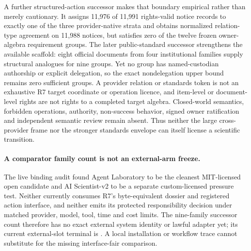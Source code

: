 A further structured-action successor makes that boundary empirical rather
than merely cautionary. It assigns 11,976 of 11,991 rights-valid notice records
to exactly one of the three provider-native strata and obtains normalized
relation-type agreement on 11,988 notices, but satisfies zero of the twelve
frozen owner-algebra requirement groups. The later public-standard successor
strengthens the available scaffold: eight official documents from four
institutional families supply structural analogues for nine groups. Yet no
group has named-custodian authorship or explicit delegation, so the exact
nondelegation upper bound remains zero sufficient groups. A provider relation
or standards token is not an exhaustive R7 target coordinate or operation
licence, and item-level or document-level rights are not rights to a completed
target algebra. Closed-world semantics, forbidden operations, authority,
non-success behavior, signed owner ratification and independent semantic
review remain absent. Thus neither the large cross-provider frame nor the
stronger standards envelope can itself license a scientific transition.

\paragraph{A comparator family count is not an external-arm freeze.}
The live binding audit found Agent Laboratory to be the cleanest MIT-licensed
open candidate and AI Scientist-v2 to be a separate custom-licensed pressure
test. Neither currently consumes R7's byte-equivalent dossier and registered
action interface, and neither emits its protected responsibility decision
under matched provider, model, tool, time and cost limits. The nine-family
successor count therefore has no exact external system identity or lawful
adapter yet; its current external-slot terminal is
. A local installation or
workflow trace cannot substitute for the missing interface-fair comparison.

